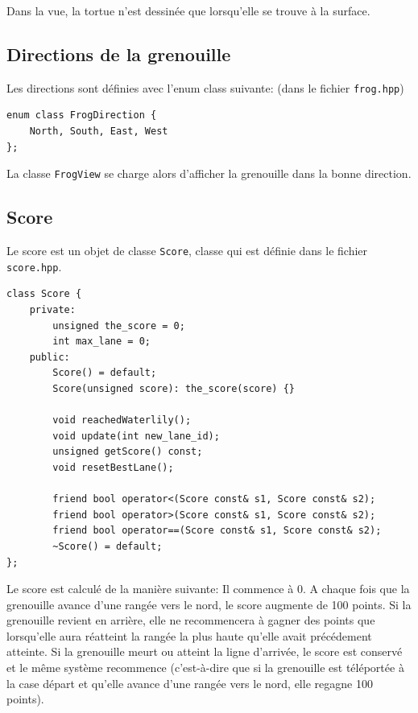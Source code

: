 \documentclass[a4paper, 12pt]{article}
\begin{document}
Dans la vue, la tortue n'est dessinée que lorsqu'elle se trouve à la surface.

\subsection{Directions de la grenouille} \label{frogview}

Les directions sont définies avec l'enum class suivante: (dans le fichier \texttt{frog.hpp})

\begin{lstlisting}
enum class FrogDirection {
    North, South, East, West
};
\end{lstlisting}

La classe \texttt{FrogView} se charge alors d'afficher la grenouille dans la bonne direction.

\subsection{Score}

Le score est un objet de classe \texttt{Score}, 
classe qui est définie dans le fichier \texttt{score.hpp}.
\begin{lstlisting}
class Score {
    private:
        unsigned the_score = 0;
        int max_lane = 0;
    public:
        Score() = default;
        Score(unsigned score): the_score(score) {}

        void reachedWaterlily();
        void update(int new_lane_id);
        unsigned getScore() const;
        void resetBestLane();

        friend bool operator<(Score const& s1, Score const& s2);
        friend bool operator>(Score const& s1, Score const& s2);
        friend bool operator==(Score const& s1, Score const& s2);
        ~Score() = default;
};
\end{lstlisting}

\pagebreak

Le score est calculé de la manière suivante: 
Il commence à 0.
A chaque fois que la grenouille avance d'une rangée vers le nord, le score augmente de 100 points.
Si la grenouille revient en arrière, 
elle ne recommencera à gagner des points que lorsqu'elle aura réatteint la rangée 
la plus haute qu'elle avait précédement atteinte.
Si la grenouille meurt ou atteint la ligne d'arrivée, le score est conservé et le même système
recommence (c'est-à-dire que si la grenouille est téléportée à la case départ et qu'elle
avance d'une rangée vers le nord, elle regagne 100 points). \\
\end{document}
